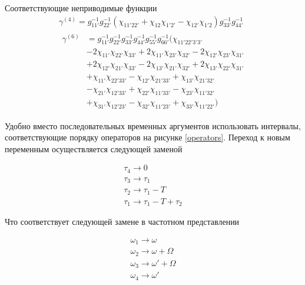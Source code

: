 \documentclass[11pt,a4paper]{report}
\begin{document}
Соответствующие неприводимые функции
\begin{equation}
\begin{split}
\gamma^{(4)} = g_{11'}^{-1}g_{22'}^{-1}\left(\chi_{11'22'}+\chi_{12}\chi_{1'2'}-\chi_{12'}\chi_{1'2}\right)g_{33'}^{-1}g_{44'}^{-1}
\\
\begin{aligned}
\gamma^{(6)} & =  g_{11'}^{-1}g_{22'}^{-1} g_{33'}^{-1}g_{44'}^{-1} g_{55'}^{-1}g_{66'}^{-1} ( \chi_{11'22'3'3'} \\
& -2 \chi_{11'} \chi_{22'} \chi_{33'} 
+2 \chi_{11'} \chi_{23'} \chi_{32'}
-2 \chi_{12'} \chi_{23'} \chi_{31'} \\ 
& +2 \chi_{12'} \chi_{21'} \chi_{33'}
-2 \chi_{13'} \chi_{21'} \chi_{32'}
+2 \chi_{13'} \chi_{22'} \chi_{31'} \\
& +\chi_{11'} \chi_{22'33'}
-\chi_{12'} \chi_{21'33'}
+\chi_{13'} \chi_{21'32'} \\
& -\chi_{21'} \chi_{12'33'}
+\chi_{22'} \chi_{11'33'}
-\chi_{23'} \chi_{11'32'} \\
& +\chi_{31'} \chi_{12'23'}
-\chi_{32'} \chi_{11'23'}
+\chi_{33'} \chi_{11'22'}
)
\end{aligned}
\end{split}
\end{equation}

Удобно вместо последовательных временных аргументов использовать интервалы, соответствующие порядку операторов на рисунке \ref{operators}.
Переход к новым переменным осуществляется следующей заменой

\begin{equation}
\begin{split}
\tau_4 \to 0 \\
\tau_3 \to \tau_1 \\
\tau_2 \to \tau_1 - T \\
\tau_1 \to \tau_1 - T + \tau_2
\end{split}
\end{equation}

Что соответствует следующей замене в частотном представлении

\begin{equation}
\begin{split}
\omega_1 \to \omega \\
\omega_2 \to \omega+\Omega \\
\omega_3 \to \omega'+\Omega \\
\omega_4 \to \omega'
\end{split}
\end{equation}
\end{document}
